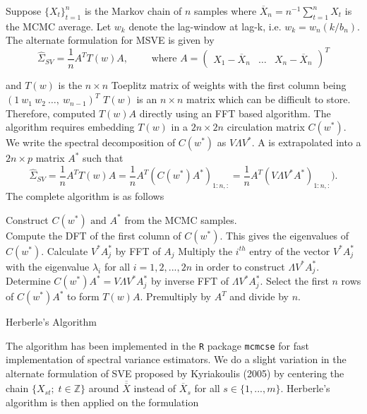 \documentclass[11pt]{article}
\theoremstyle{remark}
\begin{document}
Suppose $\{X_t\}_{t=1}^n$ is the Markov chain of $n$ samples where $\overline{X}_n = n^{-1}\sum_{t=1}^{n}X_t$ is the MCMC average. Let $w_k$ denote the lag-window at lag-k, i.e. $w_k = w_n(k/b_n)$. The alternate formulation for MSVE is given by
%
\[
    \hat{\Sigma}_{SV} = \dfrac{1}{n}A^T T(w) A, \qquad \textrm{ where } A = \begin{pmatrix}
    X_1 - \overline{X}_n  & \dots & X_n - \overline{X}_n
\end{pmatrix}^T
\]

and $T(w)$ is the $n \times n$ Toeplitz matrix of weights with the first column being $(1 ~ w_1 ~ w_2 ~ \dots, ~ w_{n-1})^T$
$T(w)$ is an $n \times n$ matrix which can be difficult to store. Therefore, \cite{heberle2017fast} computed $T(w)A$ directly using an FFT based algorithm. The algorithm requires embedding $T(w)$ in a $2n \times 2n$ circulation matrix $C(w^*)$. We write the spectral decomposition of $C(w^*)$ as $V\Lambda V^*$. A is extrapolated into a $2n \times p$ matrix $A^*$ such that
\[
    \hat{\Sigma}_{SV} = \dfrac{1}{n} A^T T(w) A = \dfrac{1}{n} A^T (C(w^*) A^*)_{1:n, :} = \dfrac{1}{n} A^T (V \Lambda V^* A^*)_{1:n, :}).
\]
The complete algorithm is as follows


\begin{algorithm}[htbp]
\DontPrintSemicolon
\SetAlgoLined
Construct $C(w^*) \textrm{ and } A^*$ from the MCMC samples.\\ Compute the DFT of the first column of $C(w^*)$. This gives the eigenvalues of $C(w^*)$.\;
    { 
    Calculate $V^*A_j^*$ by FFT of $A_j$\;
    Multiply the $i^{th}$ entry of the vector $V^* A_j^*$ with the eigenvalue $\lambda_i$ for all $i = 1, 2, ..., 2n$ in order to construct $\Lambda V^* A_j^*$.\;
    Determine $C(w^*)A^* = V \Lambda V^* A_j^*$ by inverse FFT of $\Lambda V^* A_j^*$.\;
    }
 Select the first $n$ rows of $C(w^*)A^*$ to form $T(w)A$.\;
 Premultiply by $A^T$ and divide by $n$.
 \caption{Herberle's Algorithm}
\end{algorithm}

The algorithm has been implemented in the \texttt{R} package \texttt{mcmcse} for fast implementation of spectral variance estimators. We do a slight variation in the alternate formulation of SVE proposed by Kyriakoulis (2005) by centering the chain $\{X_{st}; \; t \in \mathbb{Z}\}$ around $\overline{\overline{X}}$ instead of $\overline{X}_s$ for all $s \in \{1, ..., m\}$. Herberle's algorithm is then applied on the formulation
\end{document}
